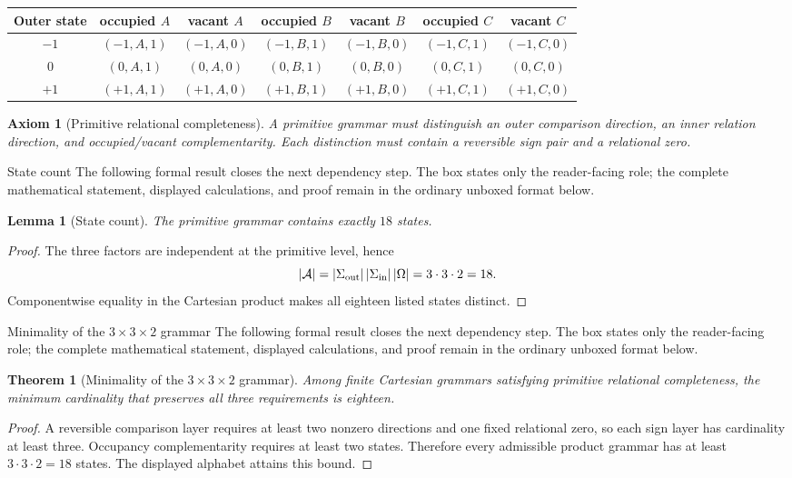 \documentclass[11pt]{article}
\numberwithin{equation}{section}
\newtheorem{axiom}[definition]{Axiom}
\newtheorem{lemma}[definition]{Lemma}
\newtheorem{theorem}[definition]{Theorem}
\theoremstyle{remark}
\begin{document}
\begin{center}
\small
\begin{tabular}{c|cc|cc|cc}
\toprule
Outer state & occupied $A$ & vacant $A$ & occupied $B$ & vacant $B$ & occupied $C$ & vacant $C$\\
\midrule
$-1$ & $(-1,A,1)$ & $(-1,A,0)$ & $(-1,B,1)$ & $(-1,B,0)$ & $(-1,C,1)$ & $(-1,C,0)$\\
$0$ & $(0,A,1)$ & $(0,A,0)$ & $(0,B,1)$ & $(0,B,0)$ & $(0,C,1)$ & $(0,C,0)$\\
$+1$ & $(+1,A,1)$ & $(+1,A,0)$ & $(+1,B,1)$ & $(+1,B,0)$ & $(+1,C,1)$ & $(+1,C,0)$\\
\bottomrule
\end{tabular}
\end{center}

\begin{axiom}[Primitive relational completeness]
A primitive grammar must distinguish an outer comparison direction, an inner relation direction, and occupied/vacant complementarity. Each distinction must contain a reversible sign pair and a relational zero.
\end{axiom}

\begin{proofguide}{State count}
The following formal result closes the next dependency step. The box states only the reader-facing role; the complete mathematical statement, displayed calculations, and proof remain in the ordinary unboxed format below.
\end{proofguide}
\begin{lemma}[State count]
The primitive grammar contains exactly $18$ states.
\end{lemma}
\begin{proof}
The three factors are independent at the primitive level, hence
\begin{equation}
|\mathcal A|=|\Sigma_{\rm out}|\,|\Sigma_{\rm in}|\,|\Omega|=3\cdot3\cdot2=18.
\end{equation}
Componentwise equality in the Cartesian product makes all eighteen listed states distinct.
\end{proof}

\begin{proofguide}{Minimality of the $3\times3\times2$ grammar}
The following formal result closes the next dependency step. The box states only the reader-facing role; the complete mathematical statement, displayed calculations, and proof remain in the ordinary unboxed format below.
\end{proofguide}
\begin{theorem}[Minimality of the $3\times3\times2$ grammar]
Among finite Cartesian grammars satisfying primitive relational completeness, the minimum cardinality that preserves all three requirements is eighteen.
\end{theorem}
\begin{proof}
A reversible comparison layer requires at least two nonzero directions and one fixed relational zero, so each sign layer has cardinality at least three. Occupancy complementarity requires at least two states. Therefore every admissible product grammar has at least $3\cdot3\cdot2=18$ states. The displayed alphabet attains this bound.
\end{proof}
\end{document}
